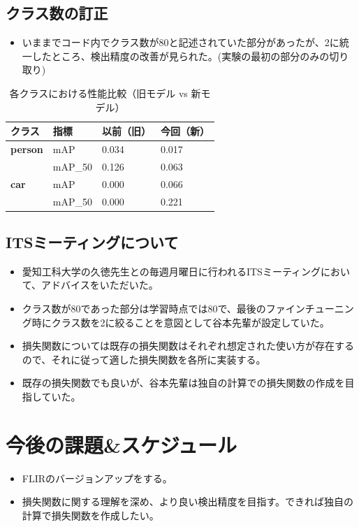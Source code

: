\documentclass[a4j]{jarticle}
\begin{document}
	\subsection{クラス数の訂正}
	\begin{itemize}
		\item いままでコード内でクラス数が80と記述されていた部分があったが、2に統一したところ、検出精度の改善が見られた。(実験の最初の部分のみの切り取り)
	\end{itemize}
	\begin{table}[ht]
		\centering
		\caption{各クラスにおける性能比較（旧モデル vs 新モデル）}
		\begin{tabular}{llll}
			\hline
			クラス & 指標 & 以前（旧） & 今回（新） \\
			\hline
			\textbf{person} & mAP      & 0.034 & 0.017 \\
							& mAP\_50  & 0.126 & 0.063 \\
			\textbf{car}    & mAP      & 0.000 & 0.066 \\
							& mAP\_50  & 0.000 & 0.221 \\
			\hline
		\end{tabular}
	\end{table}
	\subsection{ITSミーティングについて}
	\begin{itemize}
		\item 愛知工科大学の久徳先生との毎週月曜日に行われるITSミーティングにおいて、アドバイスをいただいた。
		\item クラス数が80であった部分は学習時点では80で、最後のファインチューニング時にクラス数を2に絞ることを意図として谷本先輩が設定していた。
		\item 損失関数については既存の損失関数はそれぞれ想定された使い方が存在するので、それに従って適した損失関数を各所に実装する。
		\item 既存の損失関数でも良いが、谷本先輩は独自の計算での損失関数の作成を目指していた。
	\end{itemize}
	\section{今後の課題\&スケジュール}
		\begin{itemize}
			\item FLIRのバージョンアップをする。
			\item 損失関数に関する理解を深め、より良い検出精度を目指す。できれば独自の計算で損失関数を作成したい。
		\end{itemize}
\end{document}
